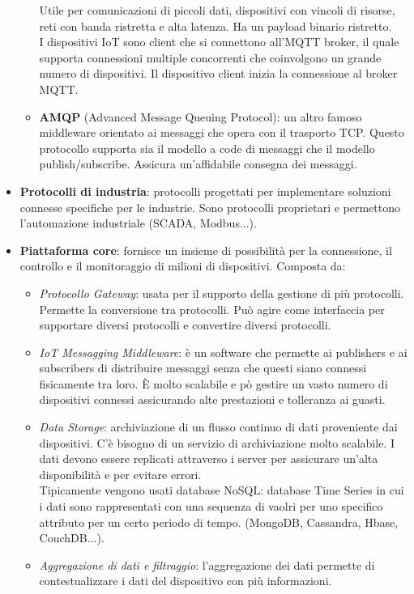 \documentclass[a4paper]{article}
\theoremstyle{definition}
\begin{document}
\begin{itemize}
\begin{itemize}
					Utile per comunicazioni di piccoli dati, dispositivi con vincoli di risorse, reti con banda ristretta e alta latenza. Ha un payload binario ristretto.\\
					I dispositivi IoT sono client che si connettono all'MQTT broker, il quale supporta connessioni multiple concorrenti che coinvolgono un grande numero di dispositivi. Il dispositivo client inizia la connessione al broker MQTT. 
					\item \textbf{AMQP} (Advanced Message Queuing Protocol): un altro famoso middleware orientato ai messaggi che opera con il trasporto TCP. Questo protocollo supporta sia il modello a code di messaggi che il modello publish/subscribe. Assicura un'affidabile consegna dei messaggi.
				\end{itemize}
				\item \textbf{Protocolli di industria}: protocolli progettati per implementare soluzioni connesse specifiche per le industrie. Sono protocolli proprietari e permettono l'automazione industriale (SCADA, Modbus...).
				\item \textbf{Piattaforma core}: fornisce un insieme di possibilità per la connessione, il controllo e il monitoraggio di milioni di dispositivi. Composta da:
				\begin{itemize}
					\item \textit{Protocollo Gateway}: usata per il supporto della gestione di più protocolli. Permette la conversione tra protocolli. Può agire come interfaccia per supportare diversi protocolli e convertire diversi protocolli.
					\item \textit{IoT Messagging Middleware}: è un software che permette ai publishers e ai subscribers di distribuire messaggi senza che questi siano connessi fisicamente tra loro. È molto scalabile e pò gestire un vasto numero di dispositivi connessi assicurando alte prestazioni e tolleranza ai guasti.
					\item \textit{Data Storage}: archiviazione di un flusso continuo di dati proveniente dai dispositivi. C'è bisogno di un servizio di archiviazione molto scalabile. I dati devono essere replicati attraverso i server per assicurare un'alta disponibilità e per evitare errori.\\
					Tipicamente vengono usati database NoSQL: database Time Series in cui i dati sono rappresentati con una sequenza di vaolri per uno specifico attributo per un certo periodo di tempo. (MongoDB, Cassandra, Hbase, CouchDB...).
					\item \textit{Aggregazione di dati e filtraggio}: l'aggregazione dei dati permette di contestualizzare i dati del dispositivo con più informazioni.

\end{itemize}
\end{itemize}
\end{document}
